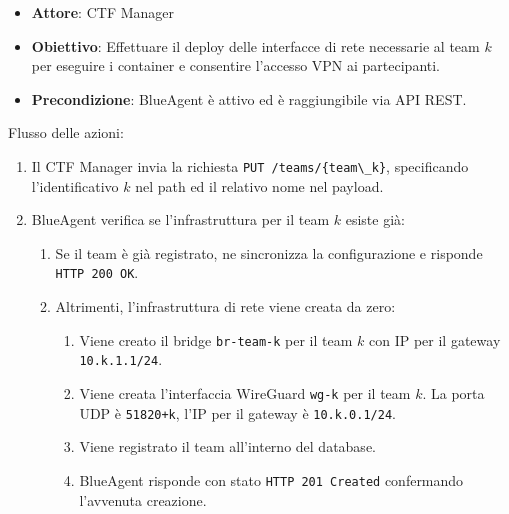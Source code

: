 \begin{itemize}
\tightlist
\item
  \textbf{Attore}: CTF Manager
\item
  \textbf{Obiettivo}: Effettuare il deploy delle interfacce di rete
  necessarie al team \(k\) per eseguire i container e consentire
  l'accesso VPN ai partecipanti.
\item
  \textbf{Precondizione}: BlueAgent è attivo ed è raggiungibile via API
  REST.
\end{itemize}

Flusso delle azioni:

\begin{enumerate}
\def\labelenumi{\arabic{enumi}.}
\tightlist
\item
  Il CTF Manager invia la richiesta
  \passthrough{\lstinline!PUT /teams/\{team\_k\}!}, specificando
  l'identificativo \(k\) nel path ed il relativo nome nel payload.
\item
  BlueAgent verifica se l'infrastruttura per il team \(k\) esiste già:

  \begin{enumerate}
  \def\labelenumii{\arabic{enumii}.}
  \tightlist
  \item
    Se il team è già registrato, ne sincronizza la configurazione e
    risponde \passthrough{\lstinline!HTTP 200 OK!}.
  \item
    Altrimenti, l'infrastruttura di rete viene creata da zero:

    \begin{enumerate}
    \def\labelenumiii{\arabic{enumiii}.}
    \tightlist
    \item
      Viene creato il bridge \passthrough{\lstinline!br-team-k!} per il
      team \(k\) con IP per il gateway
      \passthrough{\lstinline!10.k.1.1/24!}.
    \item
      Viene creata l'interfaccia WireGuard
      \passthrough{\lstinline!wg-k!} per il team \(k\). La porta UDP è
      \passthrough{\lstinline!51820+k!}, l'IP per il gateway è
      \passthrough{\lstinline!10.k.0.1/24!}.
    \item
      Viene registrato il team all'interno del database.
    \item
      BlueAgent risponde con stato
      \passthrough{\lstinline!HTTP 201 Created!} confermando l'avvenuta
      creazione.
    \end{enumerate}
  \end{enumerate}
\end{enumerate}

